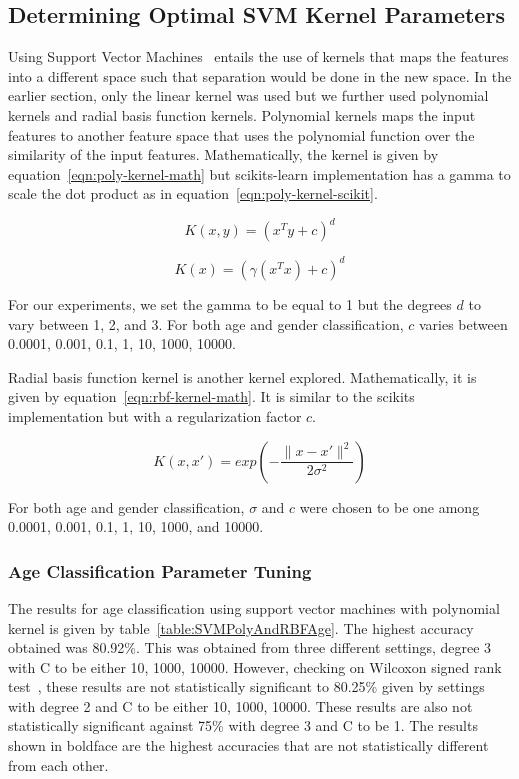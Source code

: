 \documentclass[a4paper]{llncs}
\begin{document}
\subsection{Determining Optimal SVM Kernel Parameters}
Using Support Vector Machines~\cite{cortes1995support} entails the use of kernels that maps the features into a different space such that separation would be done in the new space. In the earlier section, only the linear kernel was used but we further used polynomial kernels and radial basis function kernels. Polynomial kernels maps the input features to another feature space that uses the polynomial function over the similarity of the input features. Mathematically, the kernel is given by equation~\ref{eqn:poly-kernel-math} but scikits-learn implementation has a gamma to scale the dot product as in equation~\ref{eqn:poly-kernel-scikit}.

\begin{equation}
K(x,y) = (x^Ty + c)^d
\label{eqn:poly-kernel-math}
\end{equation}

\begin{equation}
K(x) = (\gamma(x^Tx)+c)^d
\label{eqn:poly-kernel-scikit}
\end{equation}

For our experiments, we set the gamma to be equal to 1 but the degrees $d$ to vary between 1, 2, and 3. For both age and gender classification, $c$ varies between 0.0001, 0.001, 0.1, 1, 10, 1000, 10000.   

Radial basis function kernel is another kernel explored. Mathematically, it is given by equation~\ref{eqn:rbf-kernel-math}. It is similar to the scikits implementation but with a regularization factor $c$. 

\begin{equation}
K(x,x')= exp\left( -\frac{\parallel x-x'\parallel^2}{2\sigma^2} \right)
\label{eqn:rbf-kernel-math}
\end{equation} 

For both age and gender classification, $\sigma$ and $c$ were chosen to be one among 0.0001, 0.001, 0.1, 1, 10, 1000, and 10000.

\subsubsection{Age Classification Parameter Tuning}
The results for age classification using support vector machines with polynomial kernel is given by table~\ref{table:SVMPolyAndRBFAge}. The highest accuracy obtained was 80.92\%. This was obtained from three different settings, degree 3 with C to be either 10, 1000, 10000. However, checking on Wilcoxon signed rank test~\cite{wilcoxon1945individual}, these results are not statistically significant to 80.25\% given by settings with degree 2 and C to be either 10, 1000, 10000. These results are also not statistically significant against 75\% with degree 3 and C to be 1. The results shown in boldface are the highest accuracies that are not statistically different from each other. 
\end{document}

